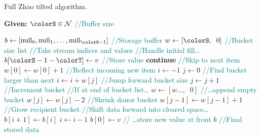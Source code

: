 \begin{algorithm}[H]
\caption{Full Zhao tilted algorithm.}
\label{alg:zhao-tilted-full}
\begin{minipage}{0.5\textwidth}
    \hspace*{\algorithmicindent} \textbf{Given:} $\colorS \in \mathcal{N}$ \textcolor{teal}{\small//Buffer size}
    \hspace*{\algorithmicindent}    \begin{algorithmic}[1]
        \State $b \gets [\mathrm{null}_0, \mathrm{null}_1, \ldots, \mathrm{null}_{\colorS - 1}]$ \textcolor{teal}{\small//Storage buffer}
        \State $w \gets [\colorS, \;\; 0]$ \textcolor{teal}{\small//Bucket size list}
         \textcolor{teal}{\small//Take stream indices and values}
         \textcolor{teal}{\small//Handle initial fill\ldots}
        \State $b[\colorS - 1 - \colorT] \gets v$ \textcolor{teal}{\small//Store value}
        \State \textbf{continue} \textcolor{teal}{\small//Skip to next item}
        \EndIf
        \State $w[0] \gets w[0] + 1$  \textcolor{teal}{\small//Reflect incoming new item}
        \State $i \gets -1$
        \State $j \gets 0$
         \textcolor{teal}{\small//Find bucket larger than next}
        \State $i \gets i + w[j]$ \textcolor{teal}{\small//Jump forward bucket size}
        \State $j \gets j + 1$ \textcolor{teal}{\small//Increment bucket}
         \textcolor{teal}{\small//If at end of bucket list\ldots}
        \State $w \gets [w\ldots,\;\; 0]$ \textcolor{teal}{\small//\ldots append empty bucket}
        \EndIf
        \EndWhile
        \State $w[j] \gets w[j] - 2$ \textcolor{teal}{\small //Shrink donor bucket}
        \State $w[j - 1] \gets w[j - 1] + 1$ \textcolor{teal}{\small //Grow recipient bucket}
         \textcolor{teal}{\small//Shift data forward into cleared space\ldots}
        \State $b[i + 1] \gets b[i]$
        \State $i \gets i - 1$
        \EndWhile
        \State $b[0] \gets v$ \textcolor{teal}{\small// \ldots store new value at front}
        \EndFor
        \Return $b$ \textcolor{teal}{\small//Final stored data}
    \end{algorithmic}
\end{minipage}
\end{algorithm}
